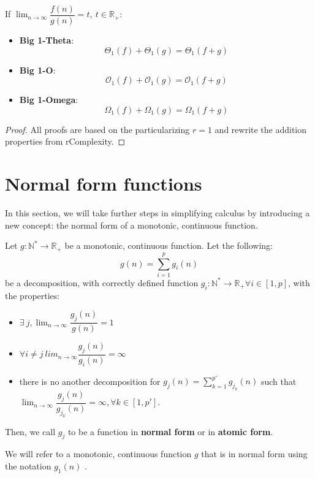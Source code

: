 \begin{lemma}
If $\lim_{n\to\infty} \dfrac{f(n)}{g(n)} = t, \ t \in \mathbb{R}_{+}$:
\begin{itemize}
  \item \textbf{Big 1-Theta}: 
  \[  \Theta_{1}(f) + \Theta_{1}(g) = \Theta_{1}(f + g)\]
  \item \textbf{Big 1-O}: 
  \[  \mathcal{O}_{1}(f) + \mathcal{O}_{1}(g) = \mathcal{O}_{1}(f + g)\]
  \item \textbf{Big 1-Omega}: 
  \[  \Omega_{1}(f) + \Omega_{1}(g) = \Omega_{1}(f + g)\]
\end{itemize}
\end{lemma}

\begin{proof}
All proofs are based on the particularizing $r=1$ and rewrite the addition properties from rComplexity.
\end{proof}

\section{Normal form functions}
In this section, we will take further steps in simplifying calculus by introducing a new concept: the normal form of a monotonic, continuous function.
\begin{definition}
Let $g:\mathbb{N}^{*}\longrightarrow\mathbb{R}_{+} $ be a monotonic, continuous function. Let the following:
\[ g(n) = \sum_{i=1}^{p} g_{i}(n)\]
be a decomposition, with correctly defined function $g_{i}:\mathbb{N}^{*}\longrightarrow\mathbb{R}_{+} \forall i \in [1, p]$, with the properties:
\begin{itemize}

\item $ \exists \ j, \lim_{n\to\infty} \dfrac{g_{j}(n)}{g(n)} = 1$
\item $\forall i \neq j \  lim_{n\to\infty} \dfrac{g_{j}(n)}{g_{i}(n)} = \infty$ 
\item there is no another decomposition for $g_{j}(n) = \sum_{k=1}^{p'} g_{j_{k}}(n)$ such that $\lim_{n\to\infty} \dfrac{g_{j}(n)}{g_{j_{k}}(n)} = \infty, \forall k \in [1, p']$.
 \end{itemize}
 Then, we call $g_{j}$ to be a function in \textbf{normal form} or in \textbf{atomic form}.
\end{definition}

\begin{remark}
We will refer to a monotonic, continuous function $g$ that is in normal form using the notation $g_{1}(n)$ .
\end{remark}


